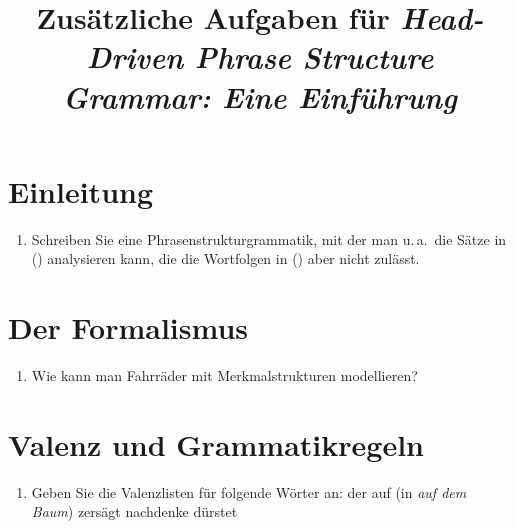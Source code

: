 \documentclass[headings=small,bibliography=totoc,index=totoc,%
toc=left,
10pt,%
cleardoublepage=empty %
]{scrbook}
\begin{document}
\title{Zusätzliche Aufgaben für \emph{Head-Driven Phrase Structure Grammar: Eine Einführung}}

\maketitle

\setcounter{chapter}{21}


\section{Einleitung}

\begin{enumerate}
\item Schreiben Sie eine Phrasenstrukturgrammatik, mit der man u.\,a.\ die Sätze in ()
      analysieren kann, die die Wortfolgen in () aber nicht zulässt.
      \eal
      \zl
      \eal
      \zl 
\end{enumerate}

\section{Der Formalismus}

\begin{enumerate}
\item Wie kann man Fahrräder mit Merkmalstrukturen modellieren?

\end{enumerate}


\section{Valenz und Grammatikregeln}

\begin{enumerate}
\item Geben Sie die Valenzlisten für folgende Wörter an:
      \eal
      \ex der
      \ex auf (in \emph{auf dem Baum})
      \ex zersägt
      \ex nachdenke
      \ex dürstet
      \zl
\end{enumerate}



\end{document}
